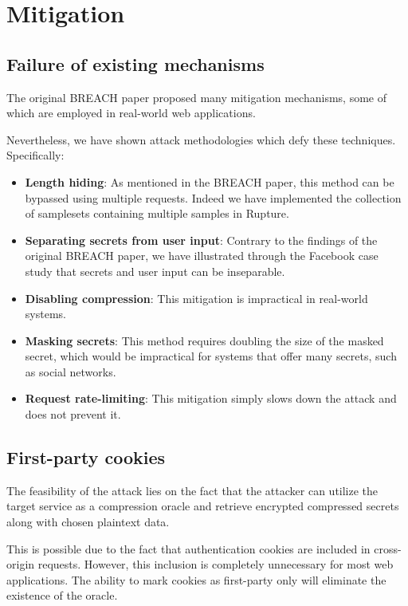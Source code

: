\documentclass[a4paper, 11 pt, conference]{article}  %
\begin{document}

\section{Mitigation}

\subsection{Failure of existing mechanisms}

The original BREACH paper proposed many mitigation mechanisms, some of which are
employed in real-world web applications.

Nevertheless, we have shown attack methodologies which defy these techniques.
Specifically:

\begin{itemize}
\item \textbf{Length hiding}: As mentioned in the BREACH paper, this method can
be bypassed using multiple requests. Indeed we have implemented the collection of
samplesets containing multiple samples in Rupture.
\item \textbf{Separating secrets from user input}: Contrary to the findings of
the original BREACH paper, we have illustrated through the Facebook case study
that secrets and user input can be inseparable.
\item \textbf{Disabling compression}: This mitigation is impractical in real-world systems.
\item \textbf{Masking secrets}: This method requires doubling the size of the
masked secret, which would be impractical for systems that offer many secrets,
such as social networks.
\item \textbf{Request rate-limiting}: This mitigation simply slows down the
attack and does not prevent it.
\end{itemize}

\subsection{First-party cookies}

The feasibility of the attack lies on the fact that the attacker can utilize the
target service as a compression oracle and retrieve encrypted compressed secrets
along with chosen plaintext data.

This is possible due to the fact that authentication cookies are included in
cross-origin requests. However, this inclusion is completely unnecessary for
most web applications. The ability to mark cookies as first-party only will
eliminate the existence of the oracle.
\end{document}
